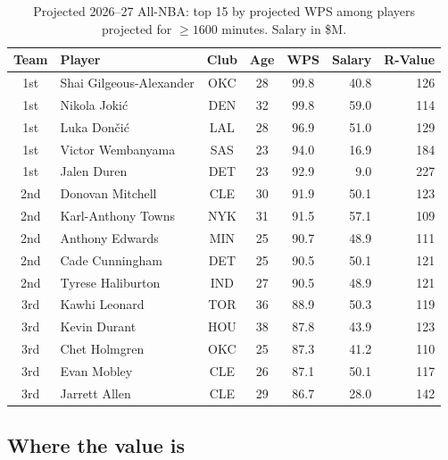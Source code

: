 \documentclass[11pt]{article}
\begin{document}
\begin{table}[h]\centering
\caption{Projected 2026--27 All-NBA: top 15 by projected WPS among players
projected for $\ge 1600$ minutes. Salary in \$M.}
\small
\begin{tabular}{clcccrr}
\toprule
Team & Player & Club & Age & WPS & Salary & R-Value \\
\midrule
1st & Shai Gilgeous-Alexander & OKC & 28 & 99.8 & 40.8 & 126 \\
1st & Nikola Joki\'c          & DEN & 32 & 99.8 & 59.0 & 114 \\
1st & Luka Don\v{c}i\'c       & LAL & 28 & 96.9 & 51.0 & 129 \\
1st & Victor Wembanyama       & SAS & 23 & 94.0 & 16.9 & 184 \\
1st & Jalen Duren             & DET & 23 & 92.9 &  9.0 & 227 \\
\midrule
2nd & Donovan Mitchell        & CLE & 30 & 91.9 & 50.1 & 123 \\
2nd & Karl-Anthony Towns      & NYK & 31 & 91.5 & 57.1 & 109 \\
2nd & Anthony Edwards         & MIN & 25 & 90.7 & 48.9 & 111 \\
2nd & Cade Cunningham         & DET & 25 & 90.5 & 50.1 & 121 \\
2nd & Tyrese Haliburton       & IND & 27 & 90.5 & 48.9 & 121 \\
\midrule
3rd & Kawhi Leonard           & TOR & 36 & 88.9 & 50.3 & 119 \\
3rd & Kevin Durant            & HOU & 38 & 87.8 & 43.9 & 123 \\
3rd & Chet Holmgren           & OKC & 25 & 87.3 & 41.2 & 110 \\
3rd & Evan Mobley             & CLE & 26 & 87.1 & 50.1 & 117 \\
3rd & Jarrett Allen           & CLE & 29 & 86.7 & 28.0 & 142 \\
\bottomrule
\end{tabular}
\end{table}

\subsection{Where the value is}
\end{document}

